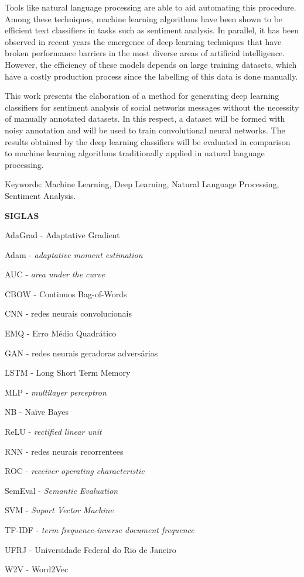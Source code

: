 Tools like natural language processing are able to aid automating this procedure.
Among these techniques, machine learning algorithms have been shown to be efficient text classifiers in tasks such as
sentiment analysis.
In parallel, it has been observed in recent years the emergence of deep learning techniques that have broken performance
barriers in the most diverse areas of artificial intelligence.
However, the efficiency of these models depends on large training datasets, which have a costly production process since
the labelling of this data is done manually.

This work presents the elaboration of a method for generating deep learning classifiers for sentiment analysis of social
networks messages without the necessity of manually annotated datasets.
In this respect, a dataset will be formed with noisy annotation and will be used to train convolutional neural networks.
The results obtained by the deep learning classifiers will be evaluated in comparison to machine learning algorithms
traditionally applied in natural language processing.

\vspace{1.0cm}

\noindent Keywords: Machine Learning, Deep Learning, Natural Language Processing, Sentiment Analysis.

\pagebreak

\begin{center}
\textbf{SIGLAS}
\end{center}
\vspace{0.5cm}

AdaGrad - Adaptative Gradient

Adam - \textit{adaptative moment estimation}

AUC - \textit{area under the curve}

CBOW - Continuos Bag-of-Words

CNN - redes neurais convolucionais

EMQ - Erro Médio Quadrático

GAN - redes neurais geradoras adversárias

LSTM - Long Short Term Memory

MLP - \textit{multilayer perceptron}

NB - Naïve Bayes

ReLU - \textit{rectified linear unit}

RNN - redes neurais recorrentees

ROC - \textit{receiver operating characteristic}

SemEval - \textit{Semantic Evaluation}

SVM - \textit{Suport Vector Machine}

TF-IDF - \textit{term frequence-inverse document frequence}

UFRJ - Universidade Federal do Rio de Janeiro

W2V - Word2Vec

\pagebreak
